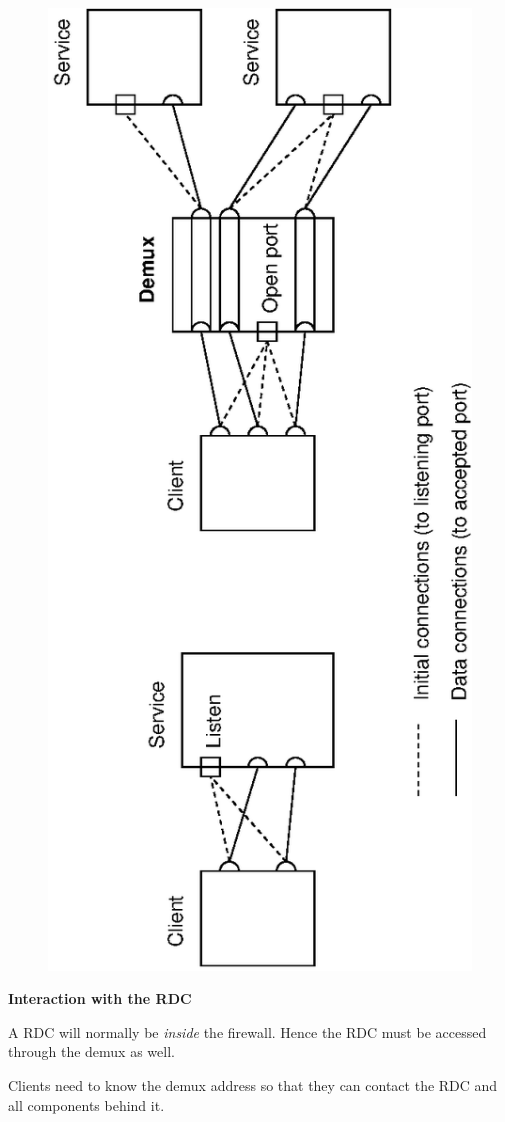 \documentclass[12pt,a4paper,twoside]{article}
\renewcommand{\_}{\texttt{\symbol{95}}}
\begin{document}
\begin{figure}[htbp]
\centering
\includegraphics[scale=1.0,angle=-90]{diagrams/demux.eps}
\label{demux}
\end{figure}

\textbf{Interaction with the RDC}

A RDC will normally be \textit{inside} the firewall.
Hence the RDC must be accessed through the demux as well.

Clients need to know the demux address so that they can contact
the RDC and all components behind it.
\end{document}
